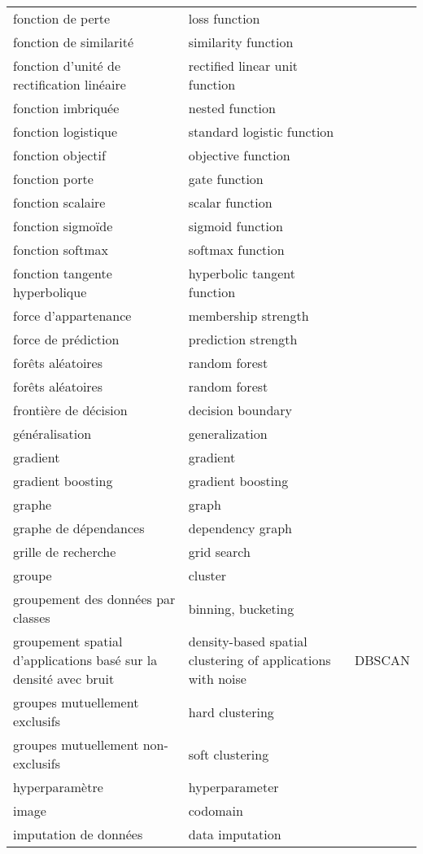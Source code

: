 \begin{longtable}{p{} p{} p{}}
fonction de perte & loss function &  \\ 
fonction de similarité & similarity function &  \\ 
fonction d'unité de rectification linéaire & rectified linear unit function &  \\ 
fonction imbriquée & nested function &  \\ 
fonction logistique & standard logistic function &  \\ 
fonction objectif & objective function &  \\ 
fonction porte & gate function &  \\ 
fonction scalaire & scalar function &  \\ 
fonction sigmoïde & sigmoid function &  \\ 
fonction softmax & softmax function &  \\ 
fonction tangente hyperbolique & hyperbolic tangent function &  \\ 
force d’appartenance & membership strength &  \\ 
force de prédiction & prediction strength &  \\ 
forêts aléatoires & random forest &  \\ 
forêts aléatoires & random forest &  \\ 
frontière de décision & decision boundary &  \\ 
généralisation & generalization &  \\ 
gradient & gradient &  \\ 
gradient boosting & gradient boosting &  \\ 
graphe & graph &  \\ 
graphe de dépendances & dependency graph &  \\ 
grille de recherche & grid search &  \\ 
groupe & cluster &  \\ 
groupement des données par classes & binning, bucketing &  \\ 
groupement spatial d’applications basé sur la densité avec bruit & density-based spatial clustering of applications with noise & DBSCAN \\ 
groupes mutuellement exclusifs & hard clustering &  \\ 
groupes mutuellement non-exclusifs & soft clustering &  \\ 
hyperparamètre & hyperparameter &  \\ 
image & codomain &  \\ 
imputation de données & data imputation &  \\ 

\end{longtable}
